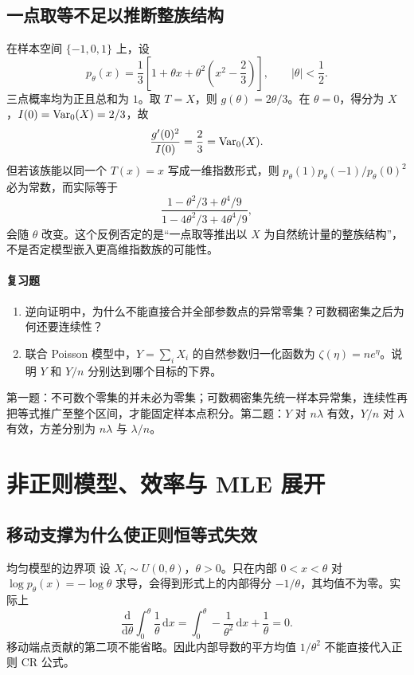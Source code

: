 \subsection{一点取等不足以推断整族结构}
在样本空间 $\{-1,0,1\}$ 上，设
\[
 p_\theta(x)=\frac13\left[1+\theta x+
 \theta^2\left(x^2-\frac23\right)\right],\qquad |\theta|<\frac12.
\]
三点概率均为正且总和为 $1$。取 $T=X$，则 $g(\theta)=2\theta/3$。在 $\theta=0$，得分为 $X$，$I(0)=\operatorname{Var}_0(X)=2/3$，故
\[
 \frac{g'(0)^2}{I(0)}=\frac23=\operatorname{Var}_0(X).
\]
但若该族能以同一个 $T(x)=x$ 写成一维指数形式，则
$p_\theta(1)p_\theta(-1)/p_\theta(0)^2$ 必为常数，而实际等于
\[
 \frac{1-\theta^2/3+\theta^4/9}{1-4\theta^2/3+4\theta^4/9},
\]
会随 $\theta$ 改变。这个反例否定的是“一点取等推出以 $X$ 为自然统计量的整族结构”，不是否定模型嵌入更高维指数族的可能性。

\paragraph{复习题}
\begin{enumerate}
 \item 逆向证明中，为什么不能直接合并全部参数点的异常零集？可数稠密集之后为何还要连续性？
 \item 联合 Poisson 模型中，$Y=\sum_iX_i$ 的自然参数归一化函数为 $\zeta(\eta)=ne^\eta$。说明 $Y$ 和 $Y/n$ 分别达到哪个目标的下界。
\end{enumerate}
\begin{notebox}[答案线索]
第一题：不可数个零集的并未必为零集；可数稠密集先统一样本异常集，连续性再把等式推广至整个区间，才能固定样本点积分。第二题：$Y$ 对 $n\lambda$ 有效，$Y/n$ 对 $\lambda$ 有效，方差分别为 $n\lambda$ 与 $\lambda/n$。
\end{notebox}

\section{非正则模型、效率与 MLE 展开}

\subsection{移动支撑为什么使正则恒等式失效}
\begin{examplebox}{均匀模型的边界项}
设 $X_i\sim U(0,\theta)$，$\theta>0$。只在内部 $0<x<\theta$ 对 $\log p_\theta(x)=-\log\theta$ 求导，会得到形式上的内部得分 $-1/\theta$，其均值不为零。实际上
\[
 \frac{\mathrm d}{\mathrm d\theta}\int_0^\theta\frac1\theta\,\mathrm dx
 =\int_0^\theta-\frac1{\theta^2}\,\mathrm dx+\frac1\theta=0.
\]
移动端点贡献的第二项不能省略。因此内部导数的平方均值 $1/\theta^2$ 不能直接代入正则 CR 公式。
\end{examplebox}


